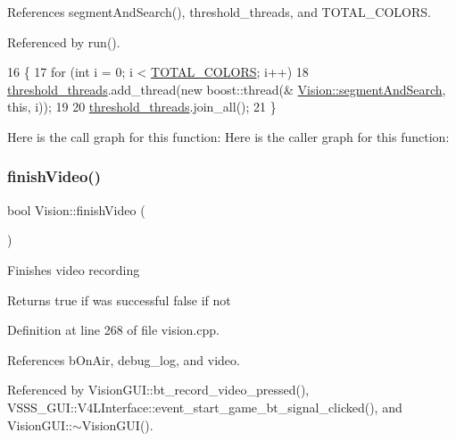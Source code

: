 References segment\+And\+Search(), threshold\+\_\+threads, and T\+O\+T\+A\+L\+\_\+\+C\+O\+L\+O\+RS.



Referenced by run().


\begin{DoxyCode}
16                       \{
17     \textcolor{keywordflow}{for} (\textcolor{keywordtype}{int} i = 0; i < \hyperlink{class_vision_a9fbea649a805b17ad9ea18f3f06c14f2}{TOTAL\_COLORS}; i++)
18         \hyperlink{class_vision_a2be0ca7754ab9d3c7a71041f87d43b1e}{threshold\_threads}.add\_thread(\textcolor{keyword}{new} boost::thread(&
      \hyperlink{class_vision_a0e43481439b4b670f5dd66caefa09494}{Vision::segmentAndSearch}, \textcolor{keyword}{this}, i));
19 
20     \hyperlink{class_vision_a2be0ca7754ab9d3c7a71041f87d43b1e}{threshold\_threads}.join\_all();
21 \}
\end{DoxyCode}
Here is the call graph for this function\+:
Here is the caller graph for this function\+:
\mbox{\label{class_vision_a5c7366071fde8a1b916be0721adaa275}} 
\subsubsection{\texorpdfstring{finish\+Video()}{finishVideo()}}
{\footnotesize\ttfamily bool Vision\+::finish\+Video (\begin{DoxyParamCaption}{ }\end{DoxyParamCaption})}

Finishes video recording \begin{DoxyReturn}{Returns}
true if was successful false if not 
\end{DoxyReturn}


Definition at line 268 of file vision.\+cpp.



References b\+On\+Air, debug\+\_\+log, and video.



Referenced by Vision\+G\+U\+I\+::bt\+\_\+record\+\_\+video\+\_\+pressed(), V\+S\+S\+S\+\_\+\+G\+U\+I\+::\+V4\+L\+Interface\+::event\+\_\+start\+\_\+game\+\_\+bt\+\_\+signal\+\_\+clicked(), and Vision\+G\+U\+I\+::$\sim$\+Vision\+G\+U\+I().


